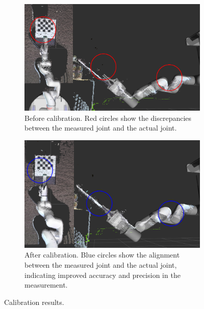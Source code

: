 \documentclass[runningheads,a4paper]{llncs}
\begin{document}
\begin{figure}[tbp]
	\centering
	\begin{subfigure}[t]{0.49\linewidth}
		\includegraphics[width=\linewidth]{images/calibration_before.png}
		\caption{Before calibration. Red circles show the discrepancies between the measured joint and the actual joint.}
	\end{subfigure}
	\hfill
	\begin{subfigure}[t]{0.49\linewidth}
		\includegraphics[width=\linewidth]{images/calibration_after.png}
		\caption{After calibration. Blue circles show the alignment between the measured joint and the actual joint, indicating improved accuracy and precision in the measurement.}
	\end{subfigure}
	\caption{Calibration results.}
	\label{fig:calibration}
\end{figure}
\end{document}
